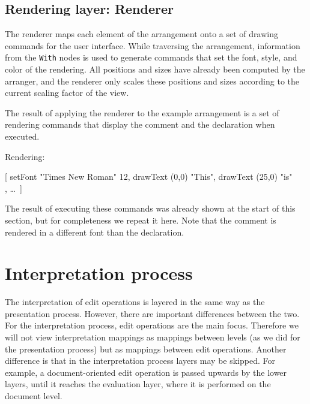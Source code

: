 \documentclass{speauth}
\begin{document}
%																
\subsection{Rendering layer: Renderer} \label{sect:renderer}

The renderer maps each element of the arrangement onto a set of drawing commands for the user interface. While traversing the arrangement, information from the \verb|With| nodes is used to generate commands that set the font, style, and color of the rendering. All positions and sizes have already been computed by the arranger, and the renderer only scales these positions and sizes according to the current scaling factor of the view. 


 The result of applying the renderer to the example arrangement is a set of rendering commands that display the comment and the declaration when executed.


Rendering:
\small \ttfamily

[ setFont "Times New Roman" 12,  drawText (0,0) "This", drawText (25,0) "is"\\
, \dots ~]
 
\rmfamily \normalsize
The result of executing these commands was already shown at the start of this section, but for completeness we repeat it here. Note that the comment is rendered in a different font than the declaration. 

\begin{center}
\end{center}

%																
%																
%																
\section{Interpretation process} \label{sect:intrProcess}

The interpretation of edit operations is layered in the same way as the presentation process. However, there are important differences between the two. For the interpretation process, edit operations are the main focus. Therefore we will not view interpretation mappings as mappings between levels (as we did for the presentation process) but as mappings between edit operations. \bc Another difference is that in the interpretation process layers may be skipped. For example, a document-oriented edit operation is passed upwards by the lower layers, until it reaches the evaluation layer, where it is performed on the document level. \ec
\end{document}
